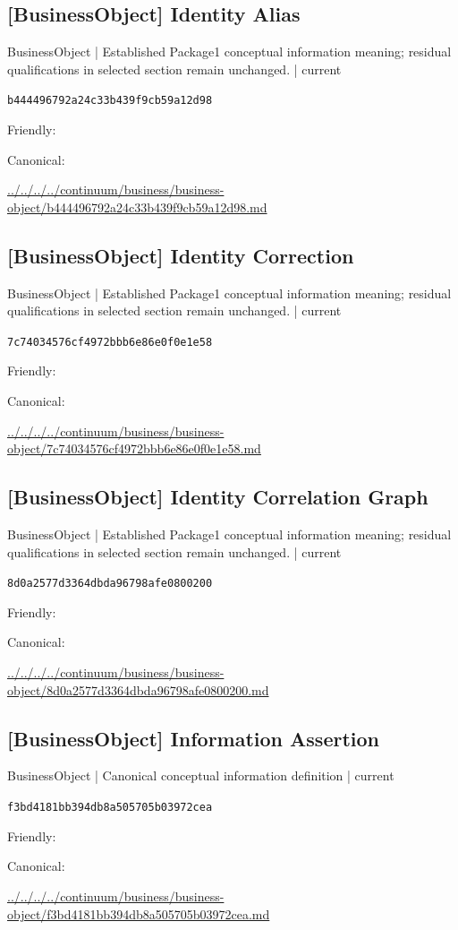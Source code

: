 \documentclass[10pt,a4paper]{article}
\begin{document}
\subsection*{[BusinessObject] Identity Alias}
{\small BusinessObject | Established Package1 conceptual information meaning; residual qualifications in selected section remain unchanged. | current}\par
\texttt{b444496792a24c33b439f9cb59a12d98}\par
Friendly: \par
Canonical: \par
{\footnotesize\url{../../../../continuum/business/business-object/b444496792a24c33b439f9cb59a12d98.md}}\par
\subsection*{[BusinessObject] Identity Correction}
{\small BusinessObject | Established Package1 conceptual information meaning; residual qualifications in selected section remain unchanged. | current}\par
\texttt{7c74034576cf4972bbb6e86e0f0e1e58}\par
Friendly: \par
Canonical: \par
{\footnotesize\url{../../../../continuum/business/business-object/7c74034576cf4972bbb6e86e0f0e1e58.md}}\par
\subsection*{[BusinessObject] Identity Correlation Graph}
{\small BusinessObject | Established Package1 conceptual information meaning; residual qualifications in selected section remain unchanged. | current}\par
\texttt{8d0a2577d3364dbda96798afe0800200}\par
Friendly: \par
Canonical: \par
{\footnotesize\url{../../../../continuum/business/business-object/8d0a2577d3364dbda96798afe0800200.md}}\par
\subsection*{[BusinessObject] Information Assertion}
{\small BusinessObject | Canonical conceptual information definition | current}\par
\texttt{f3bd4181bb394db8a505705b03972cea}\par
Friendly: \par
Canonical: \par
{\footnotesize\url{../../../../continuum/business/business-object/f3bd4181bb394db8a505705b03972cea.md}}\par
\end{document}
